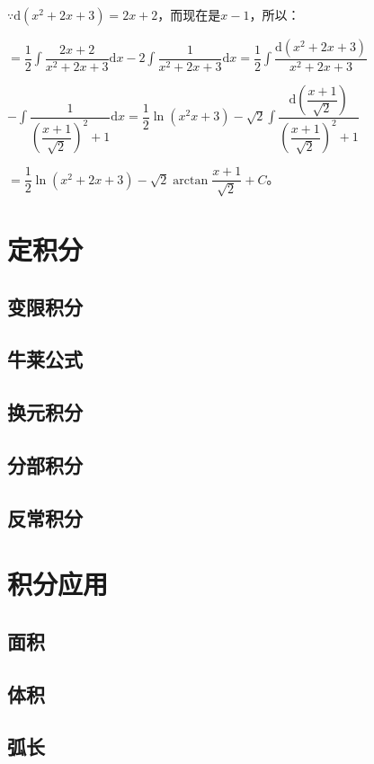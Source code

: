 \documentclass[UTF8, 12pt]{ctexart}
\begin{document}
$\because\textrm{d}(x^2+2x+3)=2x+2$，而现在是$x-1$，所以：

$=\displaystyle{\dfrac{1}{2}\int\dfrac{2x+2}{x^2+2x+3}\textrm{d}x-2\int\dfrac{1}{x^2+2x+3}\textrm{d}x}=\displaystyle{\dfrac{1}{2}\int\dfrac{\textrm{d}(x^2+2x+3)}{x^2+2x+3}}$

$-\displaystyle{\int\dfrac{1}{\left(\dfrac{x+1}{\sqrt{2}}\right)^2+1}\textrm{d}x}=\displaystyle{\dfrac{1}{2}\ln(x^2x+3)-\sqrt{2}\int\dfrac{\textrm{d}\left(\dfrac{x+1}{\sqrt{2}}\right)}{\left(\dfrac{x+1}{\sqrt{2}}\right)^2+1}}$

$=\dfrac{1}{2}\ln(x^2+2x+3)-\sqrt{2}\arctan\dfrac{x+1}{\sqrt{2}}+C$。

\section{定积分}

\subsection{变限积分}

\subsection{牛莱公式}

\subsection{换元积分}

\subsection{分部积分}

\subsection{反常积分}

\section{积分应用}

\subsection{面积}

\subsection{体积}

\subsection{弧长}
\end{document}
